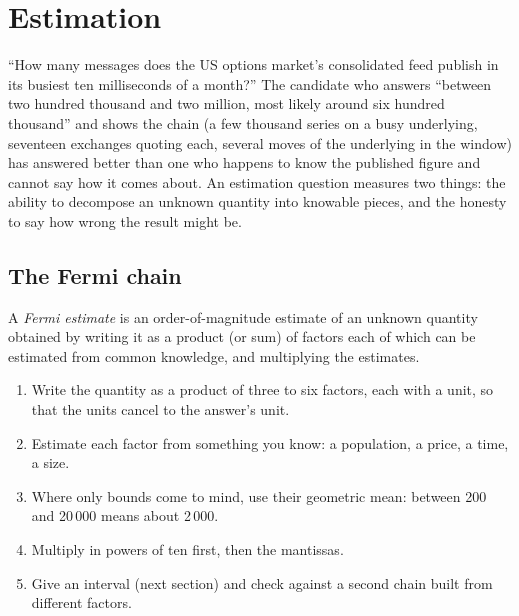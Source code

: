 \chapter{Estimation}\label{ch:iv:estimation}

``How many messages does the US options market's consolidated feed publish in its busiest ten milliseconds of
a month?'' The candidate who answers ``between two hundred thousand and two million, most likely around six
hundred thousand'' and shows the chain (a few thousand series on a busy underlying, seventeen exchanges
quoting each, several moves of the underlying in the window) has answered better than one who happens to
know the published figure and cannot say how it comes about. An estimation question measures two things: the
ability to decompose an unknown quantity into knowable pieces, and the honesty to say how wrong the result
might be.

\section{The Fermi chain}

\begin{definition}\label{def:iv:estimation:fermi}
A \emph{Fermi estimate} is an order-of-magnitude estimate of an unknown quantity
obtained by writing it as a product (or sum) of factors each of which can be estimated from common knowledge,
and multiplying the estimates.
\end{definition}

\begin{method}\label{met:iv:estimation:chain}
\begin{enumerate}
\item Write the quantity as a product of three to six factors, each with a unit, so that the units cancel to
the answer's unit.
\item Estimate each factor from something you know: a population, a price, a time, a size.
\item Where only bounds come to mind, use their geometric mean: between 200 and 20\,000 means about 2\,000.
\item Multiply in powers of ten first, then the mantissas.
\item Give an interval (next section) and check against a second chain built from different factors.
\end{enumerate}
\end{method}

